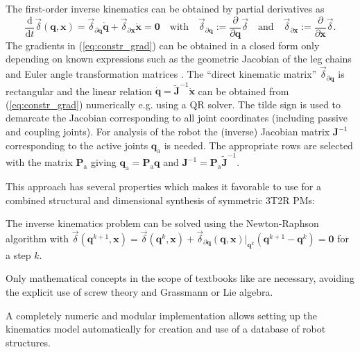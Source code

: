 \documentclass[
	graybox,
	vecphys] %
	{svmult}
\newcommand{\bm}[1]{\boldsymbol{#1}}
\newcommand{\Res}[0]{\vec{\delta}}
\begin{document}
%
The first-order inverse kinematics can be obtained by partial derivatives as
\begin{equation}
\frac{\mathrm{d}}{{\mathrm{d}}t} \Res(\bm{q},\bm{x})
=
\Res_{\partial \bm{q}} \dot{\bm{q}}
+
\Res_{\partial \bm{x}} \dot{\bm{x}}
=
\bm{0}
\quad \mathrm{with} \quad
\Res_{\partial \bm{q}}{:=}\frac{\partial}{\partial \bm{q}} \Res \quad \mathrm{and} \quad \Res_{\partial \bm{x}}{:=}\frac{\partial}{\partial \bm{x}} \Res.
\label{eq:constr_grad}
\end{equation}
%
The gradients in (\ref{eq:constr_grad}) can be obtained in a closed form only depending on known expressions such as the geometric Jacobian of the leg chains and Euler angle transformation matrices \cite{SchapplerTapOrt2019}.
The ``direct kinematic matrix'' \cite{Gogu2008} $\Res_{\partial \bm{q}}$ is rectangular and the linear relation $\dot{\bm{q}}=\tilde{\bm{J}}^{-1} \dot{\bm{x}}$ can be obtained from (\ref{eq:constr_grad}) numerically e.g. using a QR solver.
The tilde sign is used to demarcate the Jacobian corresponding to all joint coordinates (including passive and coupling joints).
For analysis of the robot the (inverse) Jacobian matrix $\bm{J}^{-1}$ corresponding to the active joints $\bm{q}_{\mathrm{a}}$ is needed.
The appropriate rows are selected with the matrix $\bm{P}_{\mathrm{a}}$ giving $\bm{q}_{\mathrm{a}} = \bm{P}_{\mathrm{a}} \bm{q}$ and $\bm{J}^{-1}=\bm{P}_{\mathrm{a}} \tilde{\bm{J}}^{-1}$.

This approach has several properties which makes it favorable to use for a combined structural and dimensional synthesis of symmetric 3T2R PMs:

\begin{compactitem}
\item The inverse kinematics problem can be solved using the Newton-Raphson algorithm with $\Res(\bm{q}^{k+1},\bm{x}) {=}
\Res(\bm{q}^{k},\bm{x})
+
\Res_{\partial \bm{q}}(\bm{q},\bm{x}) \rvert_{\bm{q}^k} (\bm{q}^{k+1} {-} \bm{q}^k){=}\bm{0}$ for a step $k$.
\item Only mathematical concepts in the scope of textbooks like \cite{Merlet2006} are necessary, avoiding the explicit use of screw theory and Grassmann or Lie algebra.
\item A completely numeric and modular implementation allows setting up the kinematics model automatically for creation and use of a database of robot structures.
\end{compactitem}
\end{document}
